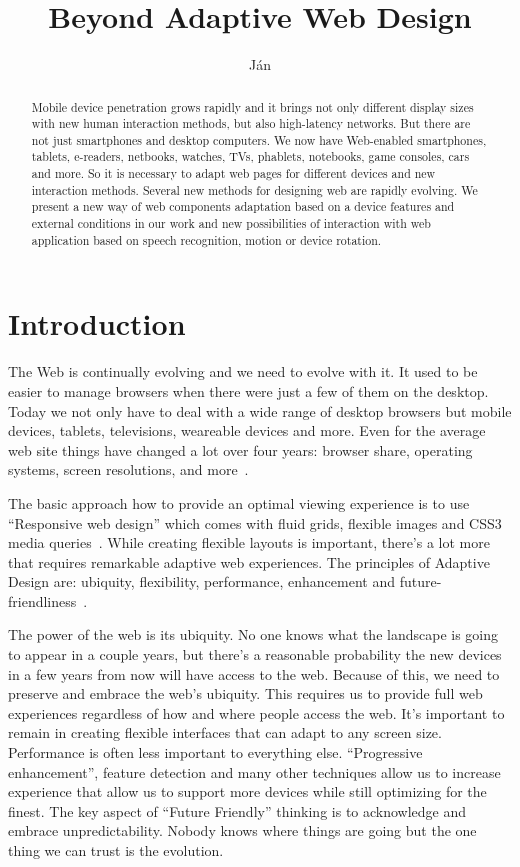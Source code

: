 \documentclass{iitsrc}
\title{Beyond Adaptive Web Design}
\author{Ján}{Antala}
\begin{document}
\begin{abstract}
Mobile device penetration grows rapidly and it brings not only different display sizes with new human interaction methods, but also high-latency networks. But there are not just smartphones and desktop computers. We now have Web-enabled smartphones, tablets, e-readers, netbooks, watches, TVs, phablets, notebooks, game consoles, cars and more. So it is necessary to adapt web pages for different devices and new interaction methods. Several new methods for designing web are rapidly evolving. We present a new way of web components adaptation based on a device features and external conditions in our work and new possibilities of interaction with web application based on speech recognition, motion or device rotation.
\end{abstract}

\section{Introduction}

The Web is continually evolving and we need to evolve with it. It used to be easier to manage browsers when there were just a few of them on the desktop. Today we not only have to deal with a wide range of desktop browsers but mobile devices, tablets, televisions, weareable devices and more. Even for the average web site things have changed a lot over four years: browser share, operating systems, screen resolutions, and more~\cite{ui17}.

The basic approach how to provide an optimal viewing experience is to use ``Responsive web design'' which comes with fluid grids, flexible images and CSS3 media queries~\cite{responsive}. While creating flexible layouts is important, there's a lot more that requires remarkable adaptive web experiences. The principles of Adaptive Design are: ubiquity, flexibility, performance, enhancement and future-friendliness~\cite{adaptivesxsw}.

The power of the web is its ubiquity. No one knows what the landscape is going to appear in a couple years, but there's a reasonable probability the new devices in a few years from now will have access to the web. Because of this, we need to preserve and embrace the web's ubiquity. This requires us to provide full web experiences regardless of how and where people access the web. It's important to remain in creating flexible interfaces that can adapt to any screen size. Performance is often less important to everything else. ``Progressive enhancement'', feature detection and many other techniques allow us to increase experience that allow us to support more devices while still optimizing for the finest. The key aspect of ``Future Friendly'' thinking is to acknowledge and embrace unpredictability. Nobody knows where things are going but the one thing we can trust is the evolution.
\end{document}
